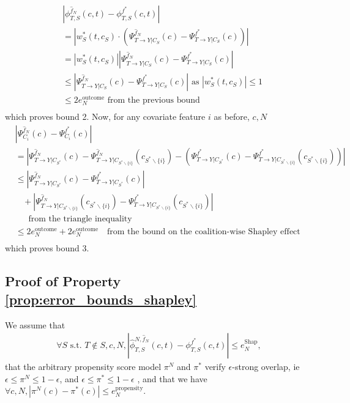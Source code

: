 \documentclass{article}
\theoremstyle{plain}
\theoremstyle{definition}
\theoremstyle{remark}
\newcommand{\effect}{\Psi}
\theoremstyle{mystyle}
\newcommand{\coalitionshapley}[4]{\phi^{#1}_{#3,#2}(#4)}
\newcommand{\estcoalitionshapley}[5]{\hat{\phi}^{#1,#2}_{#4,#3}(#5)}
\begin{document}
\begin{align*}
&|\coalitionshapley{\hat{f}_N}{S}{T}{c,t}  - \coalitionshapley{f^*}{S}{T}{c,t} | \\
&= |w_S^*(t,c_S) \cdot ( \effect^{\hat{f}_N}_{ T \rightarrow Y | C_S}(c) - \effect^{f^*}_{ T \rightarrow Y | C_S}(c))| \\
&= |w_S^*(t,c_S)| | \effect^{\hat{f}_N}_{ T \rightarrow Y | C_S}(c) - \effect^{f^*}_{ T \rightarrow Y | C_S}(c)| \\
&\leq | \effect^{\hat{f}_N}_{ T \rightarrow Y | C_S}(c) - \effect^{f^*}_{ T \rightarrow Y | C_S}(c)| \text{ as } |w^*_S(t,c_S)| \leq 1 \\
&\leq  2e^\text{outcome}_N \text{ from the previous bound} \\
\end{align*}
which proves bound 2. Now, for any covariate feature $i$ as before, $c, N$
\begin{align*}
&| \effect^{\hat{f}_N}_{C_i}(c) - \effect^{f^*}_{C_i}(c) | \\
&= |\effect^{\hat{f}_N}_{ T \rightarrow Y | C_{S^*}}(c) - \effect^{\hat{f}_N}_{ T \rightarrow Y | C_{S^*\backslash \{i\} }}(c_{S^*\backslash \{i\}})   - (\effect^{f^*}_{ T \rightarrow Y | C_{S^*}}(c) - \effect^{f^*}_{ T \rightarrow Y | C_{S^*\backslash \{i\} }}(c_{S^*\backslash \{i\}}))| \\
&\leq |\effect^{\hat{f}_N}_{ T \rightarrow Y | C_{S^*}}(c) - \effect^{f^*}_{ T \rightarrow Y | C_{S^*}}(c)| \\
& \ \ \ \ + |\effect^{\hat{f}_N}_{ T \rightarrow Y | C_{S^*\backslash \{i\} }}(c_{S^*\backslash \{i\}}) - \effect^{f^*}_{ T \rightarrow Y | C_{S^*\backslash \{i\} }}(c_{S^*\backslash \{i\}})| \\
& \ \ \ \ \ \ \ \text{from the triangle inequality} \\
&\leq 2e^\text{outcome}_N + 2e^\text{outcome}_N \ \ \ \text{ from the bound on the coalition-wise Shapley effect} \\
\end{align*}
which proves bound 3.

\subsection{Proof of Property \ref{prop:error_bounds_shapley}} 
\label{proof:error_bounds_shapley}
We assume that
\begin{align*}
\forall S \text{ s.t. } T \notin S, c, N, |\estcoalitionshapley{N}{\hat{f}_N}{S}{T}{c,t} - \coalitionshapley{f^*}{S}{T}{c,t} | \leq e^\text{Shap}_N,
\end{align*}
that the arbitrary propensity score model $\pi^N$ and $\pi^*$ verify $\epsilon$-strong overlap, ie $\epsilon \leq \pi^N \leq 1 - \epsilon$, and $\epsilon \leq \pi^* \leq 1 - \epsilon$ , and that we have $\forall c, N, |\pi^N(c) - \pi^*(c) | \leq e^\text{propensity}_N$.
\end{document}
